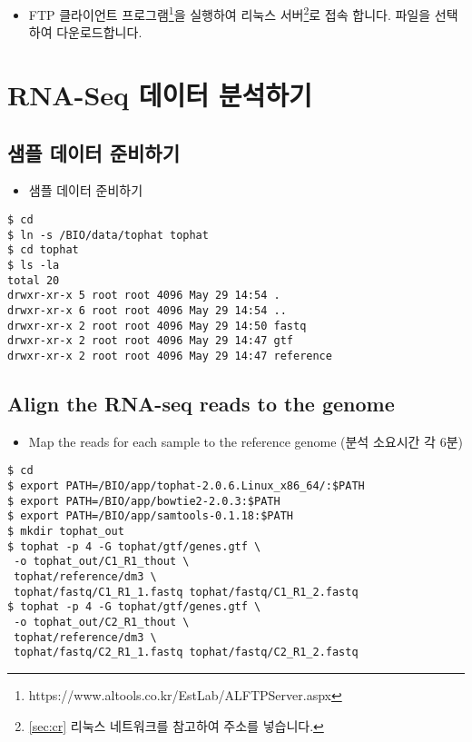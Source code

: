 \documentclass{article}
\begin{document}
\begin{itemize}
\item
  \begin{itemize}
  FTP 클라이언트 프로그램\footnote{https://www.altools.co.kr/EstLab/ALFTPServer.aspx}을 실행\cite{Feldmesser:2014hd}하여 리눅스 서버\footnote{\ref{sec:cr} 리눅스 네트워크를 참고하여 주소를 넣습니다.}로 접속\cite{Reid:2014jy} 합니다.  파일을 선택하여 다운로드합니다.  
  \end{itemize}
\end{itemize}

\clearpage
\section{RNA-Seq 데이터 분석하기}

\subsection{샘플 데이터 준비하기}
\begin{itemize}
\item
  \begin{itemize}
  샘플 데이터 준비하기  
  \end{itemize}
\end{itemize}
\begin{lstlisting}[frame=single,style=Bash,xleftmargin=1.4cm,xrightmargin=1.4cm]
$ cd
$ ln -s /BIO/data/tophat tophat
$ cd tophat
$ ls -la
total 20
drwxr-xr-x 5 root root 4096 May 29 14:54 .
drwxr-xr-x 6 root root 4096 May 29 14:54 ..
drwxr-xr-x 2 root root 4096 May 29 14:50 fastq
drwxr-xr-x 2 root root 4096 May 29 14:47 gtf
drwxr-xr-x 2 root root 4096 May 29 14:47 reference
\end{lstlisting}

\subsection{Align the RNA-seq reads to the genome}\label{sec:cr1}
\begin{itemize}
\item
  \begin{itemize}
  Map the reads for each sample to the reference genome (분석 소요시간 각 6분)
  \end{itemize}
\end{itemize}
\begin{lstlisting}[frame=single,style=Bash,xleftmargin=1.4cm,xrightmargin=1.4cm]
$ cd
$ export PATH=/BIO/app/tophat-2.0.6.Linux_x86_64/:$PATH
$ export PATH=/BIO/app/bowtie2-2.0.3:$PATH
$ export PATH=/BIO/app/samtools-0.1.18:$PATH
$ mkdir tophat_out
$ tophat -p 4 -G tophat/gtf/genes.gtf \
 -o tophat_out/C1_R1_thout \
 tophat/reference/dm3 \
 tophat/fastq/C1_R1_1.fastq tophat/fastq/C1_R1_2.fastq
$ tophat -p 4 -G tophat/gtf/genes.gtf \
 -o tophat_out/C2_R1_thout \
 tophat/reference/dm3 \
 tophat/fastq/C2_R1_1.fastq tophat/fastq/C2_R1_2.fastq
\end{lstlisting}
\end{document}
